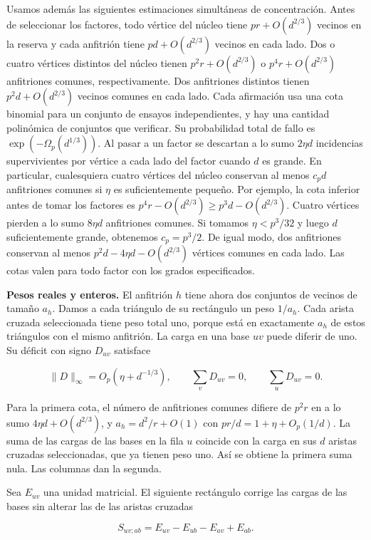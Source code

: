 \documentclass[spanish,11pt,a4paper]{article}
\begin{document}
Usamos además las siguientes estimaciones simultáneas de concentración. Antes de seleccionar los factores, todo vértice del núcleo tiene \(pr+O(d^{2/3})\) vecinos en la reserva y cada anfitrión tiene \(pd+O(d^{2/3})\) vecinos en cada lado. Dos o cuatro vértices distintos del núcleo tienen \(p^2r+O(d^{2/3})\) o \(p^4r+O(d^{2/3})\) anfitriones comunes, respectivamente. Dos anfitriones distintos tienen \(p^2d+O(d^{2/3})\) vecinos comunes en cada lado. Cada afirmación usa una cota binomial para un conjunto de ensayos independientes, y hay una cantidad polinómica de conjuntos que verificar. Su probabilidad total de fallo es \(\exp(-\Omega_p(d^{1/3}))\). Al pasar a un factor se descartan a lo sumo \(2\eta d\) incidencias supervivientes por vértice a cada lado del factor cuando \(d\) es grande. En particular, cualesquiera cuatro vértices del núcleo conservan al menos \(c_p d\) anfitriones comunes si \(\eta\) es suficientemente pequeño. Por ejemplo, la cota inferior antes de tomar los factores es \(p^4r-O(d^{2/3})\ge p^3d-O(d^{2/3})\). Cuatro vértices pierden a lo sumo \(8\eta d\) anfitriones comunes. Si tomamos \(\eta<p^3/32\) y luego \(d\) suficientemente grande, obtenemos \(c_p=p^3/2\). De igual modo, dos anfitriones conservan al menos \(p^2d-4\eta d-O(d^{2/3})\) vértices comunes en cada lado. Las cotas valen para todo factor con los grados especificados.

\textbf{Pesos reales y enteros.} El anfitrión \(h\) tiene ahora dos conjuntos de vecinos de tamaño \(a_h\). Damos a cada triángulo de su rectángulo un peso \(1/a_h\). Cada arista cruzada seleccionada tiene peso total uno, porque está en exactamente \(a_h\) de estos triángulos con el mismo anfitrión. La carga en una base \(uv\) puede diferir de uno. Su déficit con signo \(D_{uv}\) satisface

\[\|D\|_\infty=O_p(\eta+d^{-1/3}),\qquad
\sum_vD_{uv}=0,\qquad\sum_uD_{uv}=0 .\]

Para la primera cota, el número de anfitriones comunes difiere de \(p^2r\) en a lo sumo \(4\eta d+O(d^{2/3})\), y \(a_h=d^2/r+O(1)\) con \(pr/d=1+\eta+O_p(1/d)\). La suma de las cargas de las bases en la fila \(u\) coincide con la carga en sus \(d\) aristas cruzadas seleccionadas, que ya tienen peso uno. Así se obtiene la primera suma nula. Las columnas dan la segunda.

Sea \(E_{uv}\) una unidad matricial. El siguiente rectángulo corrige las cargas de las bases sin alterar las de las aristas cruzadas

\[S_{uv;ab}=E_{uv}-E_{ub}-E_{av}+E_{ab}.\]
\end{document}

